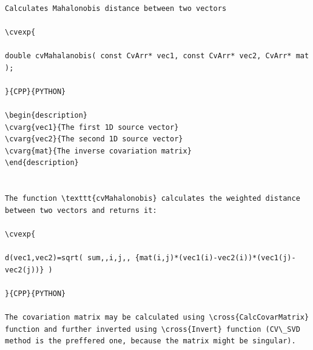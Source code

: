 \label{Mahalonobis}
\begin{verbatim}

Calculates Mahalonobis distance between two vectors

\cvexp{

double cvMahalanobis( const CvArr* vec1, const CvArr* vec2, CvArr* mat );

}{CPP}{PYTHON}

\begin{description}
\cvarg{vec1}{The first 1D source vector}
\cvarg{vec2}{The second 1D source vector}
\cvarg{mat}{The inverse covariation matrix}
\end{description}


The function \texttt{cvMahalonobis} calculates the weighted distance between two vectors and returns it:

\cvexp{

d(vec1,vec2)=sqrt( sum,,i,j,, {mat(i,j)*(vec1(i)-vec2(i))*(vec1(j)-vec2(j))} )

}{CPP}{PYTHON}

The covariation matrix may be calculated using \cross{CalcCovarMatrix} function and further inverted using \cross{Invert} function (CV\_SVD method is the preffered one, because the matrix might be singular).


\end{verbatim}
